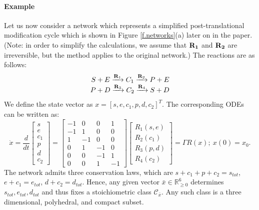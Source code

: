 \documentclass[onefignum,onetabnum]{siamonline220329}
\newcommand\bx{{\bar x}}
\newcommand{\R}{{\rm \bf R}}
\newcommand{\Cs}{\mathscr C}
\begin{document}
\paragraph{Example} Let us now consider a network which represents a simplified post-translational modification cycle which is shown in Figure \ref{f.networks}(a) later on in the paper. (Note: in order to simplify the calculations, we assume that $\bf R_1$ and $\bf R_2$ are irreversible, but the method applies to the original network.) The reactions are as follows:
\begin{equation}\label{e.ptm} \begin{array}{rl}  S+ E \xrightarrow{\R_1} C_1 \xrightarrow{\R_2} P+E \\ P+D \xrightarrow{\R_3} C_2 \xrightarrow{\R_4} S+D \end{array}\end{equation}
We define the state vector as $x=[s,e,c_1,p,d,c_2]^T$. The corresponding ODEs can be written as:
\begin{equation}
\label{e.ptm.eqn}
\dot x=\frac{d}{dt}\begin{bmatrix}s\\e\\c_1\\p\\d\\ c_2 \end{bmatrix}=\left[\begin{array}{rrrr} -1 & 0 & 0 & 1 \\ -1 & 1 & 0 & 0 \\  1 & -1 & 0 & 0 \\ 0 & 1 & -1 & 0  \\ 0 & 0 & -1 & 1 \\ 0 & 0 & 1 & -1 \end{array}\right]\begin{bmatrix}R_1(s,e)\\R_2(c_1)\\R_3(p,d)\\R_4(c_2) \end{bmatrix} = \Gamma R(x);~x(0)=x_0.
\end{equation}
The network admits three conservation laws, which are $s+c_1+p+c_2=s_{tot}$, $e+c_1=e_{tot}$, $d+c_2=d_{tot}$. Hence, any given vector $\bx\in\mathbb R_{\ge0}^6$ determines $s_{tot},e_{tot},d_{tot}$ and thus fixes a stoichiometric class $\Cs_\bx$. Any such class is a three dimensional, polyhedral, and compact subset.
 	
\end{document}
